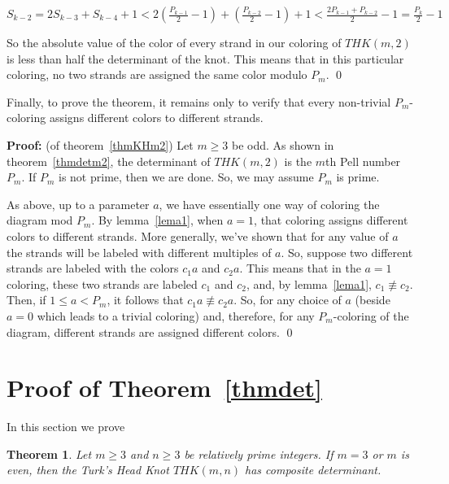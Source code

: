 \documentclass{amsart}
\newtheorem{thm}{Theorem}
\begin{document}
\begin{center}
$S_{k-2}=2S_{k-3}+S_{k-4}+1<2(\frac{P_{k-1}}{2}-1)+(\frac{P_{k-2}}{2}-1)+1<
\frac{2P_{k-1}+P_{k-2}}{2}-1=\frac{P_{k}}{2}-1$
\end{center}

So the absolute value of the color of every strand in our coloring of $THK(m,2)$ is less than half the determinant of the knot. This means that in this particular coloring, no two strands are assigned the same color modulo $P_m$.
{\qed}

\medskip

Finally, to prove the theorem, it remains only to verify that every non-trivial $P_m$-coloring assigns different colors to different strands. 

\medskip

{\noindent \textbf{Proof: }} (of theorem~\ref{thmKHm2})
Let $m \geq 3$ be odd. As shown in theorem~\ref{thmdetm2}, the
determinant of $THK(m,2)$ is the $m$th Pell number $P_m$.
If $P_m$ is not prime, then we are done.  So, we may assume $P_m$ is prime. 

As above, up to a parameter $a$, we have essentially
one way of coloring the diagram mod $P_m$.  By lemma~\ref{lema1}, when $a=1$, that coloring assigns different colors to 
different strands. More generally, we've shown that
for any value of $a$ the strands will be labeled with different multiples of $a$. So, suppose two different strands
are labeled with the colors $c_1a$ and $c_2a$. This means that in
the $a=1$ coloring, these two strands are labeled $c_1$ and $c_2$, and,
by lemma~\ref{lema1}, $c_1 \not\equiv c_2$. Then, if $1 \leq a < P_m$, it
follows that $c_1a \not\equiv c_2a$. So, for any choice of $a$ (beside $a  = 0$ which leads to a trivial coloring) and, therefore, for any 
$P_m$-coloring
of the diagram, different strands are assigned different colors. {\qed}

\section{Proof of Theorem~\ref{thmdet}}

\setcounter{thm}{3}

In this section we prove

\begin{thm}
Let $m \geq 3$ and $n \geq 3$ be relatively prime integers.
If $m = 3$ or $m$ is even, then the Turk's Head Knot $THK(m,n)$ 
has composite determinant.
\end{thm}
\end{document}
